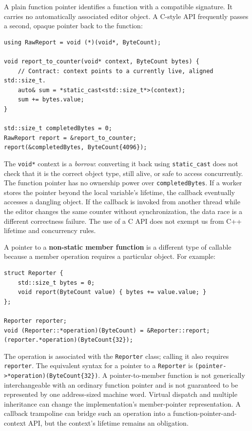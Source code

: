 A plain function pointer identifies a function with a compatible signature. It carries no automatically associated editor object. A C-style API frequently passes a second, opaque pointer back to the function:

\begin{verbatim}
using RawReport = void (*)(void*, ByteCount);

void report_to_counter(void* context, ByteCount bytes) {
    // Contract: context points to a currently live, aligned std::size_t.
    auto& sum = *static_cast<std::size_t*>(context);
    sum += bytes.value;
}

std::size_t completedBytes = 0;
RawReport report = &report_to_counter;
report(&completedBytes, ByteCount{4096});
\end{verbatim}

The \texttt{void*} context is a \emph{borrow}: converting it back using \texttt{static\_cast} does not check that it is the correct object type, still alive, or safe to access concurrently. The function pointer has no ownership power over \texttt{completedBytes}. If a worker stores the pointer beyond the local variable's lifetime, the callback eventually accesses a dangling object. If the callback is invoked from another thread while the editor changes the same counter without synchronization, the data race is a different correctness failure. The use of a C API does not exempt us from C++ lifetime and concurrency rules.

A pointer to a \textbf{non-static member function} is a different type of callable because a member operation requires a particular object. For example:

\begin{verbatim}
struct Reporter {
    std::size_t bytes = 0;
    void report(ByteCount value) { bytes += value.value; }
};

Reporter reporter;
void (Reporter::*operation)(ByteCount) = &Reporter::report;
(reporter.*operation)(ByteCount{32});
\end{verbatim}

The operation is associated with the \texttt{Reporter} class; calling it also requires \texttt{reporter}. The equivalent syntax for a pointer to a \texttt{Reporter} is \texttt{(pointer-\textgreater{}*operation)(ByteCount\{32\})}. A pointer-to-member function is not generically interchangeable with an ordinary function pointer and is not guaranteed to be represented by one address-sized machine word. Virtual dispatch and multiple inheritance can change the implementation's member-pointer representation. A callback trampoline can bridge such an operation into a function-pointer-and-context API, but the context's lifetime remains an obligation.

